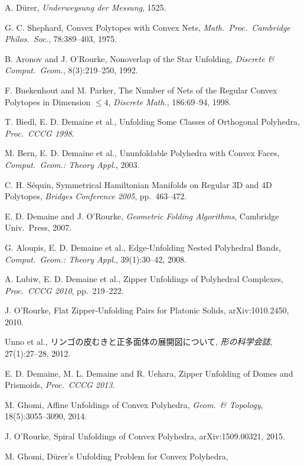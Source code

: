 \documentclass[a4paper,11pt]{article}
\begin{document}
\begin{enumerate}[label={[\arabic*]}, leftmargin=2em]
  \item A. Dürer, \textit{Underweysung der Messung}, 1525.
  \item G. C. Shephard, Convex Polytopes with Convex Nets,
        \textit{Math.\ Proc.\ Cambridge Philos.\ Soc.}, 78:389--403, 1975.
  \item B. Aronov and J. O'Rourke, Nonoverlap of the Star Unfolding,
        \textit{Discrete \& Comput.\ Geom.}, 8(3):219--250, 1992.
  \item F. Buekenhout and M. Parker, The Number of Nets of the Regular Convex Polytopes
        in Dimension $\leq 4$,
        \textit{Discrete Math.}, 186:69--94, 1998.
  \item T. Biedl, E. D. Demaine et al., Unfolding Some Classes of Orthogonal Polyhedra,
        \textit{Proc.\ CCCG 1998}.
  \item M. Bern, E. D. Demaine et al., Ununfoldable Polyhedra with Convex Faces,
        \textit{Comput.\ Geom.: Theory Appl.}, 2003.
  \item C. H. Séquin, Symmetrical Hamiltonian Manifolds on Regular 3D and 4D Polytopes,
        \textit{Bridges Conference 2005}, pp.~463--472.
  \item E. D. Demaine and J. O'Rourke, \textit{Geometric Folding Algorithms},
        Cambridge Univ.\ Press, 2007.
  \item G. Aloupis, E. D. Demaine et al., Edge-Unfolding Nested Polyhedral Bands,
        \textit{Comput.\ Geom.: Theory Appl.}, 39(1):30--42, 2008.
  \item A. Lubiw, E. D. Demaine et al., Zipper Unfoldings of Polyhedral Complexes,
        \textit{Proc.\ CCCG 2010}, pp.~219--222.
  \item J. O'Rourke, Flat Zipper-Unfolding Pairs for Platonic Solids,
        arXiv:1010.2450, 2010.
  \item Unno et al., リンゴの皮むきと正多面体の展開図について,
        \textit{形の科学会誌}, 27(1):27--28, 2012.
  \item E. D. Demaine, M. L. Demaine and R. Uehara, Zipper Unfolding of Domes and Prismoids,
        \textit{Proc.\ CCCG 2013}.
  \item M. Ghomi, Affine Unfoldings of Convex Polyhedra,
        \textit{Geom.\ \& Topology}, 18(5):3055--3090, 2014.
  \item J. O'Rourke, Spiral Unfoldings of Convex Polyhedra,
        arXiv:1509.00321, 2015.
  \item M. Ghomi, Dürer's Unfolding Problem for Convex Polyhedra,

\end{enumerate}
\end{document}
